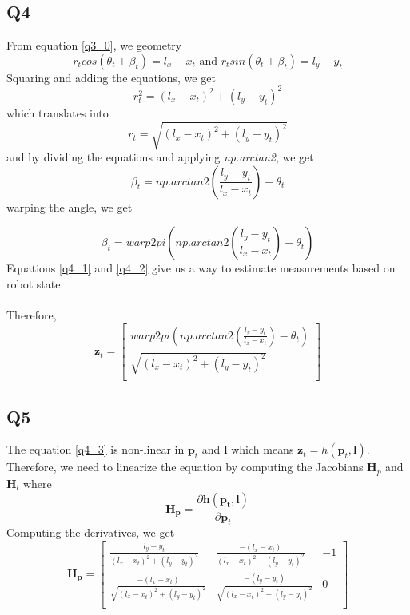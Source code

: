 \documentclass[12pt, a4paper]{article}
\begin{document}
\subsection{Q4}
From equation \ref{q3_0}, we geometry
\[r_tcos(\theta_t + \beta_t) = l_x - x_t \text{ and } r_tsin(\theta_t + \beta_t) = l_y - y_t\]
Squaring and adding the equations, we get
\[r_t^2 = (l_x - x_t)^2 + (l_y - y_t)^2\]
which translates into
\begin{equation}
  \label{q4_1}
  r_t = \sqrt{(l_x - x_t)^2 + (l_y - y_t)^2}
\end{equation}
and by dividing the equations and applying \textit{np.arctan2}, we get
\[\beta_t = \textit{np.arctan2}\left(\frac{l_y - y_t}{l_x - x_t}\right) - \theta_t\]
warping the angle, we get

\begin{equation}
  \label{q4_2}  
  \beta_t = \textit{warp2pi}\left(\textit{np.arctan2}\left(\frac{l_y - y_t}{l_x - x_t}\right) - \theta_t\right)
\end{equation}
Equations \ref{q4_1} and \ref{q4_2} give us a way to estimate measurements based on robot state.\\\\
Therefore,
\begin{equation}
  \label{q4_3}
  \mathbf{z}_t = \begin{bmatrix}
    \textit{warp2pi}\left(\textit{np.arctan2}\left(\frac{l_y - y_t}{l_x - x_t}\right) - \theta_t\right)\\
    \sqrt{(l_x - x_t)^2 + (l_y - y_t)^2}\\
  \end{bmatrix}
\end{equation} 
\subsection{Q5}
The equation \ref{q4_3} is non-linear in $\mathbf{p}_t$ and $\mathbf{l}$ which means $\mathbf{z}_t = h(\mathbf{p}_t, \mathbf{l})$. Therefore, we need to linearize the equation by computing the Jacobians $\mathbf{H}_p$ and $\mathbf{H}_l$ where
\[\mathbf{H_p} = \frac{\partial \mathbf{h(\mathbf{p}_t, \mathbf{l})}}{\partial\mathbf{p}_t}\]
Computing the derivatives, we get
\[\mathbf{H_p} = \begin{bmatrix}
  \frac{l_y - y_t}{(l_x - x_t)^2 + (l_y - y_t)^2} & \frac{-(l_x - x_t)}{(l_x - x_t)^2 + (l_y - y_t)^2} & - 1\\
  \frac{-(l_x - x_t)}{\sqrt{(l_x - x_t)^2 + (l_y - y_t)^2}} & \frac{-(l_y - y_t)}{\sqrt{(l_x - x_t)^2 + (l_y - y_t)^2}} & 0\\
\end{bmatrix}\]
\end{document}
